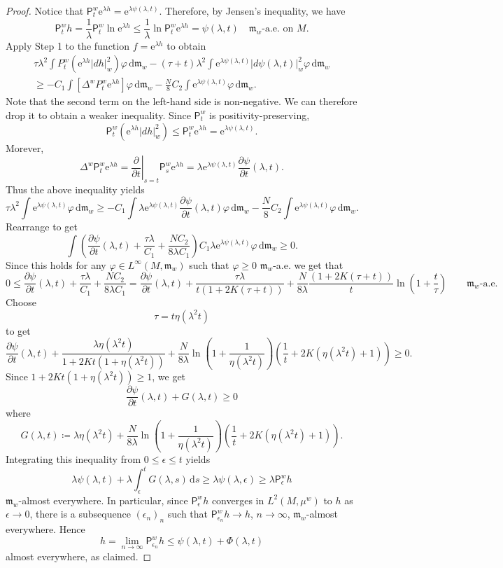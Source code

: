 \documentclass[10pt]{article}
\newcommand{\m}{\mathfrak{m}}
\newcommand{\M}{{\mathit{M}}}
\renewcommand{\d}{\,\mathrm{d}}
\newcommand{\e}{\mathrm{e}}
\renewcommand{\P}{\mathsf{P}}
\newcommand{\df}{\coloneqq}
\theoremstyle{plain}
\theoremstyle{definition}
\newcommand{\Linfw}{L^{\infty}(M,\m_w)}
\begin{document}
\begin{proof}
Notice that $\P_t^w \e^{\lambda h}=\e^{\lambda\psi(\lambda, t)}.$ Therefore, by Jensen's inequality, we have
\[
\P_t^wh=\frac{1}{\lambda}\P_t^w\ln \e^{\lambda h}
\leq \frac{1}{\lambda}\ln \P_t^w\e^{\lambda h}=\psi(\lambda,t) \quad \text{$\m_w$-a.e.~on $M$.}
\]
Apply Step 1 to the function 
$f = \e^{\lambda h}$ to obtain
\begin{multline*}
    \tau\lambda^2\int P_t^w(\e^{\lambda h}|dh|_w^2)\varphi\d \m_w
    -(\tau+t)\lambda^2\int \e^{\lambda \psi(\lambda,t)}|d\psi(\lambda,t)|_w^2\varphi\d \m_w \\
        \geq -C_1\int [\Delta^w P_t^w\e^{\lambda h}]\varphi\d\m_w -\frac{N}{8}C_2\int \e^{\lambda \psi(\lambda,t)}\varphi\d \m_w.
\end{multline*}
Note that the second term on the left-hand side is non-negative. We can therefore drop it to obtain a weaker inequality. Since $\P_t^w$ is positivity-preserving,
\[
\P_t^w(\e^{\lambda h}|d h|_w^2)\leq \P_t^w\e^{\lambda h}
=\e^{\lambda\psi(\lambda,t)}.\]
Morever,
\[
\Delta^w \P_t^w\e^{\lambda h} = \left. \frac{\partial }{\partial t} \right|_{s=t} \P_s^w\e^{\lambda h} = \lambda \e^{\lambda \psi(\lambda,t)}\frac{\partial\psi}{\partial t}(\lambda, t).
\]
Thus the above inequality yields
\[
    \tau\lambda^2\int \e^{\lambda\psi(\lambda,t)}\varphi\d \m_w
        \geq -C_1\int \lambda \e^{\lambda \psi(\lambda,t)}\frac{\partial\psi}{\partial t}(\lambda, t) \varphi\d\m_w -\frac{N}{8}C_2\int \e^{\lambda \psi(\lambda,t)}\varphi\d \m_w.
\]
Rearrange to get
\[
    \int \left( \frac{\partial\psi}{\partial t}(\lambda,t)  +\frac{\tau \lambda}{C_1} + \frac{NC_2}{8\lambda C_1} \right) C_1 \lambda\e^{\lambda \psi(\lambda,t)}\varphi\d \m_w\geq0 .
\]
Since this holds for any $\varphi\in \Linfw$ such that $\varphi \ge 0$ $\m_w$-a.e. we get that 
\[
   0  \leq  \frac{\partial\psi}{\partial t}(\lambda,t)  + \frac{\tau \lambda}{C_1} + \frac{NC_2}{8\lambda C_1} = \frac{\partial\psi}{\partial t}(\lambda,t)  + \frac{\tau \lambda}{t(1+2K(\tau+t))} + \frac{N}{8\lambda}\frac{(1+2K(\tau+t))}{t}\ln\left(1+\frac{t}{\tau}\right) \qquad \text{$\m_w$-a.e.}
\]
Choose
\[
\tau = t \eta (\lambda^2 t)
\]
to get
\[
    \frac{\partial\psi}{\partial t} (\lambda,t)
    +\frac{\lambda \eta (\lambda^2 t)}{1 + 2Kt(1+\eta(\lambda^2 t))} + \frac{N}{8 \lambda} \ln \left( 1 + \frac{1}{\eta(\lambda^2 t)} \right) \left( \frac{1}{t} + 2 K (\eta(\lambda^2t )+1)\right)
     \geq0.
   \]
   Since $1 + 2Kt(1+\eta(\lambda^2 t)) \ge 1$, we get
   \[
    \frac{\partial\psi}{\partial t} (\lambda,t)
    +G(\lambda,t)
     \geq0
   \]
   where
   \[
   G(\lambda,t) \df \lambda \eta (\lambda^2 t) + \frac{N}{8 \lambda} \ln \left( 1 + \frac{1}{\eta(\lambda^2 t)} \right) \left( \frac{1}{t} + 2 K (\eta(\lambda^2t)+1)\right).
   \]
 Integrating this inequality from $0\leq \epsilon\leq t$ yields 
\[\lambda\psi(\lambda,t)+\lambda\int_{\epsilon}^t G(\lambda,s)\d s\geq \lambda \psi(\lambda,\epsilon)\geq \lambda \P_{\epsilon}^wh\]
$\m_w$-almost everywhere. In particular, since $\P_\epsilon^wh$ converges in $L^2(\M,\mu^w)$ to $h$ as $\epsilon\to0$, there is a subsequence $(\epsilon_n)_n$ such that $\P_{\epsilon_n}^wh\to h$, $n\to\infty$, $\m_w$-almost everywhere. Hence
\[
h=
\lim_{n\to \infty}\P_{\epsilon_n}^w h
\leq \psi(\lambda,t)+\Phi(\lambda,t)
\]
almost everywhere, as claimed.


\end{proof}
\end{document}
